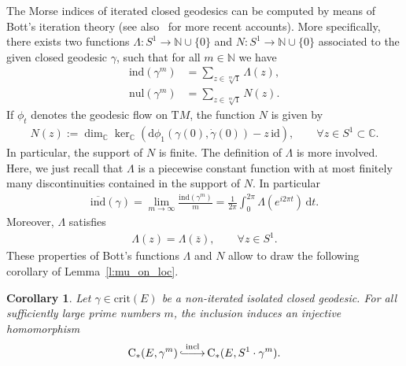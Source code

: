 \documentclass[reqno]{amsart}
\numberwithin{equation}{section}
\theoremstyle{personal}%
\newtheorem{cor}[thm]{Corollary}
\theoremstyle{definition}
\newcommand{\N}{\mathds{N}}
\newcommand{\C}{\mathds{C}}
\newcommand{\diff}{\mathrm{d}}
\newcommand{\incl}{\mathrm{incl}}
\newcommand{\Tan}{\mathrm{T}}
\newcommand{\crit}{\mathrm{crit}}
\newcommand{\Loc}{\mathrm{C}}
\newcommand{\avind}{\overline{\ind}}
\newcommand{\ind}{\mathrm{ind}}
\newcommand{\nul}{\mathrm{nul}}
\DeclareRobustCommand{\llonghookrightarrow}{\lhook\joinrel\relbar\joinrel\relbar\joinrel\rightarrow}
\DeclareMathOperator*{\eembup}{\llonghookrightarrow}
\begin{document}
The Morse indices of iterated closed geodesics can be computed by means of Bott's iteration theory \cite{Bott:1956sp} (see also~\cite{Long:2002ed, Mazzucchelli:2015zc} for more recent accounts). More specifically, there exists two functions $\Lambda:S^1\to\N\cup\{0\}$ and $N:S^1\to\N\cup\{0\}$ associated to the given closed geodesic $\gamma$, such that for all $m\in\N$ we have
\begin{align}
\label{e:Bott_formula_index}
\ind(\gamma^m) & = \sum_{z\in\!\sqrt[m]{1}} \Lambda(z),\\
\label{e:Bott_formula_nullity}
\nul(\gamma^m) & = \sum_{z\in\!\sqrt[m]{1}} N(z).
\end{align}
If  $\phi_t$ denotes the geodesic flow on $\Tan M$, the function $N$ is given by
\begin{align*}
N(z) := \dim_{\C}\ker_{\C}(\diff\phi_1(\gamma(0),\dot\gamma(0))-z\,\mathrm{id}),
\qquad\forall z\in S^1\subset\C.
\end{align*}
In particular, the support of $N$ is finite. 
The definition of $\Lambda$ is more involved. Here, we just recall that $\Lambda$ is a piecewise constant function with at most finitely many discontinuities contained in the support of $N$. In particular
\begin{align}
\label{e:Bott_average_idx}
 \avind(\gamma)=\lim_{m\to\infty}\frac{\ind(\gamma^m)}{m} = \frac{1}{2\pi} \int_0^{2\pi} \Lambda(e^{i2\pi t})\,\diff t.
\end{align}
Moreover, $\Lambda$ satisfies
\begin{align}
\label{e:Lambda_conj_inv}
 \Lambda(z)=\Lambda(\overline z),
 \qquad
 \forall z\in S^1.
\end{align}
These properties of Bott's functions $\Lambda$ and $N$ allow to draw the following corollary of Lemma~\ref{l:mu_on_loc}.


\begin{cor}
\label{c:incl_local_homologies}
Let $\gamma\in\crit(E)$ be a non-iterated isolated closed geodesic. For all sufficiently large prime numbers $m$, the inclusion induces an injective homomorphism
\begin{align}
\label{e:injective_incl}
 \Loc_*(E,\gamma^m) \eembup^{\incl} \Loc_*(E,S^1\cdot\gamma^m).
\end{align}
\end{cor}
\end{document}
